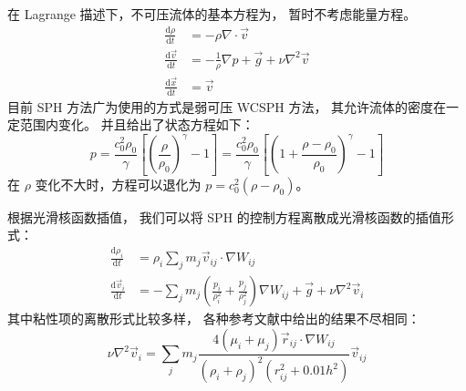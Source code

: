 \begin{frame}
    在 Lagrange 描述下，不可压流体的基本方程为，
    暂时不考虑能量方程。
    \begin{equation}
        \begin{aligned}
            \frac{\mathrm{d} \rho}{\mathrm{d} t} &= -\rho \nabla \cdot \vec{v} \\
            \frac{\mathrm{d} \vec{v}}{\mathrm{d} t} &= -\frac{1}{\rho} \nabla p + \vec{g} + \nu \nabla^2 \vec{v}\\
            \frac{\mathrm{d} \vec{x}}{\mathrm{d} t} &= \vec{v}
        \end{aligned}
    \end{equation}
    目前 SPH 方法广为使用的方式是弱可压 WCSPH 方法，
    其允许流体的密度在一定范围内变化。
    并且给出了状态方程如下：
    \begin{equation}
        p = \frac{c_0^2\rho_0}{\gamma}
        \left[\left(\frac{\rho}{\rho_0}\right)^\gamma - 1\right]=
        \frac{c_0^2\rho_0}{\gamma}
        \left[\left(1+\frac{\rho-\rho_0}{\rho_0}\right)^\gamma - 1\right]
    \end{equation}
    在 $\rho$ 变化不大时，方程可以退化为 $p=c_0^2(\rho-\rho_0)$。
\end{frame}

\begin{frame}
    根据光滑核函数插值，
    我们可以将 SPH 的控制方程离散成光滑核函数的插值形式：
    \begin{equation}
        \begin{aligned}
            \frac{\mathrm{d} \rho_i}{\mathrm{d} t} &= \rho_i \sum_j m_j \vec{v}_{ij} \cdot \nabla W_{ij} \\
            \frac{\mathrm{d} \vec{v}_i}{\mathrm{d} t} &= -\sum_j m_j \left(\frac{p_i}{\rho_i^2} + \frac{p_j}{\rho_j^2}\right) \nabla W_{ij} + \vec{g} + \nu \nabla^2 \vec{v}_i
        \end{aligned}
    \end{equation}
    其中粘性项的离散形式比较多样，
    各种参考文献中给出的结果不尽相同：
    \begin{equation}
        \nu \nabla^2 \vec{v}_i = 
        \sum_j m_j
        \frac{4 (\mu_i + \mu_j) \vec{r}_{ij}\cdot \nabla W_{ij}}{(\rho_i + \rho_j)^2 (r_{ij}^2 + 0.01h^2)}\vec{v}_{ij}
    \end{equation}
\end{frame}

